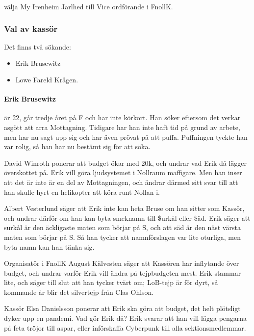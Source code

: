 \documentclass[hidelinks]{sektionsmote} %
\begin{document}
\begin{beslut}
  \item välja My Irenheim Jarlhed till Vice ordförande i FnollK.
\end{beslut}

\subsubsection{Val av kassör}
Det finns två sökande:
\begin{itemize}
    \item Erik Brusewitz
    \item Lowe Fareld Krågen.
\end{itemize}

\paragraph{Erik Brusewitz} är 22, går tredje året på F och har inte körkort.
Han söker eftersom det verkar asgött att arra Mottagning.
Tidigare har han inte haft tid på grund av arbete, men har nu sagt upp sig och har även prövat på att puffa.
Puffningen tyckte han var rolig, så han har nu bestämt sig för att söka.\par
David Winroth ponerar att budget ökar med 20k, och undrar vad Erik då lägger överskottet på.
Erik vill göra ljudsystemet i Nollraum maffigare.
Men han inser att det är inte är en del av Mottagningen, och ändrar därmed sitt svar till att han skulle hyrt en helikopter att köra runt Nollan i.\par
Albert Vesterlund säger att Erik inte kan heta Bruse om han sitter som Kassör, och undrar därför om han kan byta smeknamn till \$urkål eller \$äd.
Erik säger att surkål är den äckligaste maten som börjar på S, och att säd är den näst värsta maten som börjar på S.
Så han tycker att namnförslagen var lite oturliga, men byta namn kan han tänka sig.\par
Organisatör i FnollK August Kälvesten säger att Kassören har inflytande över budget, och undrar varför Erik vill ändra på tejpbudgeten mest.
Erik stammar lite, och säger till slut att han tycker tvärt om;
LoB-tejp är för dyrt, så kommande år blir det silvertejp från Clas Ohlson.\par
Kassör Elsa Danielsson ponerar att Erik ska göra att budget, det helt plötsligt dyker upp en pandemi.
Vad gör Erik då?
Erik svarar att han vill lägga pengarna på feta tröjor till aspar, eller införskaffa Cyberpunk till alla sektionsmedlemmar.\par
\end{document}
